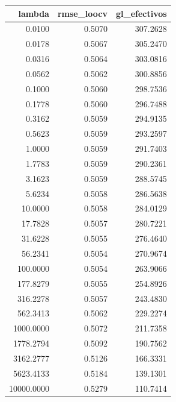 \begin{tabular}{rrr}
\toprule
lambda & rmse\_loocv & gl\_efectivos \\
\midrule
0.0100 & 0.5070 & 307.2628 \\
0.0178 & 0.5067 & 305.2470 \\
0.0316 & 0.5064 & 303.0816 \\
0.0562 & 0.5062 & 300.8856 \\
0.1000 & 0.5060 & 298.7536 \\
0.1778 & 0.5060 & 296.7488 \\
0.3162 & 0.5059 & 294.9135 \\
0.5623 & 0.5059 & 293.2597 \\
1.0000 & 0.5059 & 291.7403 \\
1.7783 & 0.5059 & 290.2361 \\
3.1623 & 0.5059 & 288.5745 \\
5.6234 & 0.5058 & 286.5638 \\
10.0000 & 0.5058 & 284.0129 \\
17.7828 & 0.5057 & 280.7221 \\
31.6228 & 0.5055 & 276.4640 \\
56.2341 & 0.5054 & 270.9674 \\
100.0000 & 0.5054 & 263.9066 \\
177.8279 & 0.5055 & 254.8926 \\
316.2278 & 0.5057 & 243.4830 \\
562.3413 & 0.5062 & 229.2274 \\
1000.0000 & 0.5072 & 211.7358 \\
1778.2794 & 0.5092 & 190.7562 \\
3162.2777 & 0.5126 & 166.3331 \\
5623.4133 & 0.5184 & 139.1301 \\
10000.0000 & 0.5279 & 110.7414 \\
\bottomrule
\end{tabular}
